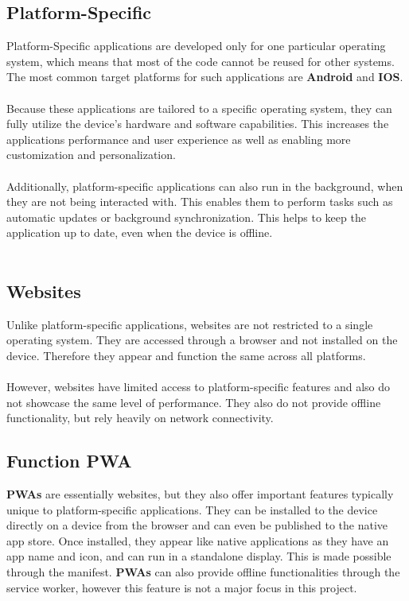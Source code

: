 \documentclass[a4paper,12pt]{report}
\begin{document}
\subsection{Platform-Specific}
Platform-Specific applications are developed only for one particular operating system, which means that most of the code cannot be reused for other systems. The most common target platforms for such applications are \textbf{Android} and \textbf{IOS}.\\\\
Because these applications are tailored to a specific operating system, they can fully utilize the device’s hardware and software capabilities. This increases the applications performance and user experience as well as enabling more customization and personalization.\parencite{native-apps}\\\\
Additionally, platform-specific applications can also run in the background, when they are not being interacted with. This enables them to perform tasks such as automatic updates or background synchronization. This helps to keep the application up to date, even when the device is offline.\parencite{mdn-pwa}\\\\
\subsection{Websites}
Unlike platform-specific applications, websites are not restricted to a single operating system. They are accessed through a browser and not installed on the device. Therefore they appear and function the same across all platforms.\parencite{mdn-pwa}\\\\
However, websites have limited access to platform-specific features and also do not showcase the same level of performance. They also do not provide offline functionality, but rely heavily on network connectivity.
\subsection{Function PWA}
\textbf{PWAs} are essentially websites, but they also offer important features typically unique to platform-specific applications. They can be installed to the device directly on a device from the browser and can even be published to the native app store. Once installed, they appear like native applications as they have an app name and icon, and can run in a standalone display. This is made possible through the manifest. \textbf{PWAs} can also provide offline functionalities through the service worker, however this feature is not a major focus in this project.\parencite{mdn-pwa}
\end{document}
